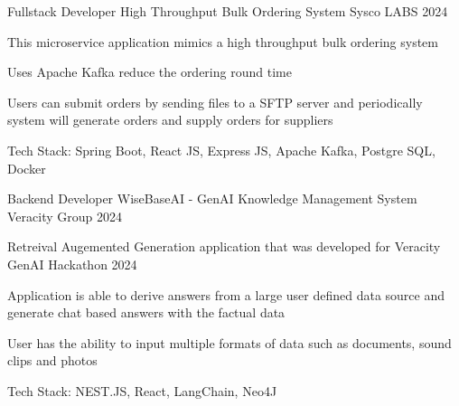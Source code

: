 

\begin{cventries}
    
    
    
    \cventry
    {Fullstack Developer} %
    {High Throughput Bulk Ordering System \href{https://visionvid.vercel.app/}{\faGithubSquare}} %
    {Sysco LABS} %
    {2024} %
    {
        \begin{cvitems} %
            \item {This microservice application mimics a high throughput bulk ordering system}
            \item {Uses Apache Kafka reduce the ordering round time}
            \item {Users can submit orders by sending files to a SFTP server and periodically system will generate orders and supply orders for suppliers}
            \item {Tech Stack: Spring Boot, React JS, Express JS, Apache Kafka, Postgre SQL, Docker}
        \end{cvitems}
    } 



    \cventry
    {Backend Developer} %
    {WiseBaseAI - GenAI Knowledge Management System \href{https://visionvid.vercel.app/}{\faGithubSquare}} %
    {Veracity Group} %
    {2024} %
    {
        \begin{cvitems} %
            \item {Retreival Augemented Generation application that was developed for Veracity GenAI Hackathon 2024}
            \item {Application is able to derive answers from a large user defined data source and generate chat based answers with the factual data}
            \item {User has the ability to input multiple formats of data such as documents, sound clips and photos}
            \item {Tech Stack: NEST.JS, React, LangChain, Neo4J}
        \end{cvitems}
    } 
    

\end{cventries}

